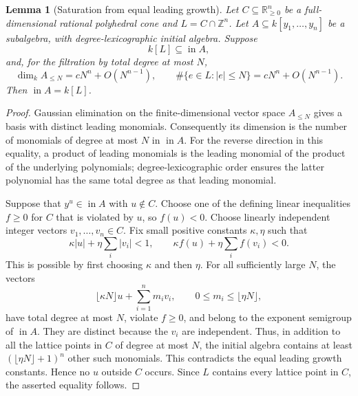 \documentclass[11pt]{article}
\newtheorem{lemma}[theorem]{Lemma}
\theoremstyle{definition}
\theoremstyle{remark}
\newcommand{\Z}{\mathbb Z}
\newcommand{\inA}{\operatorname{in}}
\begin{document}
\begin{lemma}[Saturation from equal leading growth]\label{lem:growth}
Let $C\subseteq\mathbb R_{\ge0}^n$ be a full-dimensional rational polyhedral
cone and $L=C\cap\Z^n$. Let $A\subseteq k[y_1,\ldots,y_n]$ be a subalgebra,
with degree-lexicographic initial algebra. Suppose
\[
 k[L]\subseteq\inA A,
\]
and, for the filtration by total degree at most $N$,
\[
 \dim_k A_{\le N}=cN^n+O(N^{n-1}),\qquad
 \#\{e\in L:|e|\le N\}=cN^n+O(N^{n-1}).
\]
Then $\inA A=k[L]$.
\end{lemma}
\begin{proof}
Gaussian elimination on the finite-dimensional vector space $A_{\le N}$
gives a basis with distinct leading monomials. Consequently its dimension
is the number of monomials of degree at most $N$ in $\inA A$.
For the reverse direction in this equality, a product of leading monomials
is the leading monomial of the product of the underlying polynomials;
degree-lexicographic order ensures the latter polynomial has the same
total degree as that leading monomial.

Suppose that $y^u\in\inA A$ with $u\notin C$. Choose one of the defining
linear inequalities $f\ge0$ for $C$ that is violated by $u$, so $f(u)<0$.
Choose linearly independent integer vectors $v_1,\ldots,v_n\in C$.
Fix small positive constants $\kappa,\eta$ such that
\[
 \kappa|u|+\eta\sum_i|v_i|<1,
 \qquad \kappa f(u)+\eta\sum_i f(v_i)<0.
\]
This is possible by first choosing $\kappa$ and then $\eta$.
For all sufficiently large $N$, the vectors
\[
 \lfloor\kappa N\rfloor u+\sum_{i=1}^n m_iv_i,
 \qquad 0\le m_i\le\lfloor\eta N\rfloor,
\]
have total degree at most $N$, violate $f\ge0$, and belong to the exponent
semigroup of $\inA A$. They are distinct because the $v_i$ are independent.
Thus, in addition to all the lattice points in $C$ of degree at most $N$,
the initial algebra contains at least
$(\lfloor\eta N\rfloor+1)^n$ other such monomials. This contradicts the
equal leading growth constants. Hence no $u$ outside $C$ occurs. Since
$L$ contains every lattice point in $C$, the asserted equality follows.
\end{proof}
\end{document}

